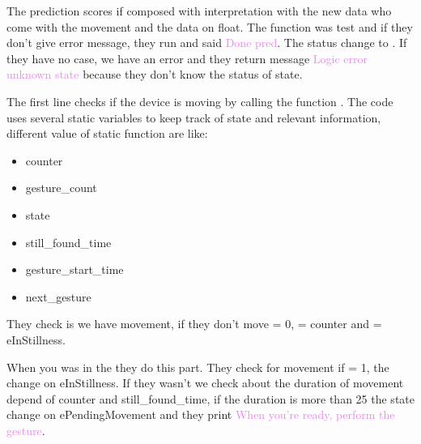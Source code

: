 The prediction scores if composed with interpretation with the new data who come with the movement and the data on float. The function  was test and if they don't give error message, they run and said  \textcolor{violet}{Done pred}. The status change to . If they have no case, we have an error and they return message \textcolor{violet}{Logic error unknown state} because they don't know the status of state. 

\begin{center}
    \label{Magic Wand function}
\end{center}

The first line checks if the device is moving by calling the function .
The code uses several static variables to keep track of state and relevant information, different value of static function are like: 
\begin{itemize}
    \item counter
    \item gesture\_count
    \item state
    \item still\_found\_time
    \item gesture\_start\_time
    \item next\_gesture
\end{itemize}

\begin{center}
    \label{Magic Wand function}
\end{center}

They check is we have movement, if they don't move  = 0,   = counter and  = eInStillness.  

\begin{center}
    \label{Magic Wand function}
\end{center}

When you was in the  they do this part. They check for movement if  = 1, the  change on eInStillness. If they wasn't we check about the duration of movement depend of counter and still\_found\_time, if the duration is more than 25 the state change on ePendingMovement and they print \textcolor{violet}{When you're ready, perform the gesture}. 

